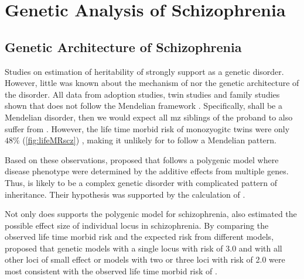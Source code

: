 
	\section{Genetic Analysis of Schizophrenia}
	\subsection{Genetic Architecture of Schizophrenia}
	Studies on estimation of heritability of  strongly support  as a genetic disorder.
	However, little was known about the mechanism of  nor the genetic architecture of the disorder. 
	All data from adoption studies, twin studies and family studies shown that  does not follow the Mendelian framework \citep{Gottesman01071967,Gottesman1982}.
	Specifically, shall  be a Mendelian disorder, then we would expect all \gls{mz} siblings of the proband to also suffer from .
	However, the life time morbid risk of monozyogitc twins were only $48\%$ (\cref{fig:lifeMRscz}) \citep{gottesman1991schizophrenia}, making it unlikely for  to follow a Mendelian pattern.
	
	Based on these observations, \citet{Gottesman1967} proposed that  follows a polygenic model where disease phenotype were determined by the additive effects from multiple genes.
	Thus,  is likely to be a complex genetic disorder with complicated pattern of inheritance. 
	Their hypothesis was supported by the calculation of \citet{Risch1990a}.
	
	Not only does \citet{Risch1990a} supports the polygenic model for schizophrenia, \citet{Risch1990a} also estimated the possible effect size of individual locus in schizophrenia. 
	By comparing the observed life time morbid risk and the expected risk from different models, \citet{Risch1990a} proposed that genetic models with a single locus with risk of 3.0 and with all other loci of small effect or models with two or three loci with risk of 2.0 were most consistent with the observed life time morbid risk of  \citep{Risch1990}.
	
